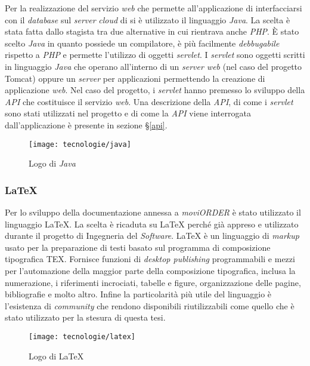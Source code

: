 Per la realizzazione del servizio \textit{web} che permette all'applicazione di interfacciarsi con il \textit{database} sul \textit{server} \textit{cloud} di \visione{} si è utilizzato il linguaggio \textit{Java}. La scelta è stata fatta dallo stagista tra due alternative in cui rientrava anche \textit{PHP}. È stato scelto \textit{Java} in quanto possiede un compilatore, è più facilmente \textit{debbugabile} rispetto a \textit{PHP} e permette l'utilizzo di oggetti \textit{servlet}.  I \textit{servlet} sono oggetti scritti in linguaggio \textit{Java} che operano all'interno di un \textit{server web} (nel caso del progetto Tomcat) oppure un \textit{server} per applicazioni permettendo la creazione di applicazione \textit{web}. Nel caso del progetto, i \textit{servlet} hanno premesso lo sviluppo della \textit{API} che costituisce il servizio \textit{web}. Una descrizione della \textit{API}, di come i \textit{servlet} sono stati utilizzati nel progetto e di come la \textit{API} viene interrogata dall'applicazione è presente in sezione §\ref{api}.

\begin{figure}[!h] 
    \centering 
    \texttt{[image: tecnologie/java]} 
    \caption{Logo di \textit{Java}}
\end{figure}

\subsubsection{\LaTeX{}}

Per lo sviluppo della documentazione annessa a \textit{moviORDER} è stato utilizzato il linguaggio \LaTeX{}. La scelta è ricaduta su \LaTeX{} perché già appreso e utilizzato durante il progetto di Ingegneria del \textit{Software}. \LaTeX{} è un linguaggio di \textit{markup} usato per la preparazione di testi basato sul programma di composizione tipografica TEX. Fornisce funzioni di \textit{desktop publishing} programmabili e mezzi per l'automazione della maggior parte della composizione tipografica, inclusa la numerazione, i riferimenti incrociati, tabelle e figure, organizzazione delle pagine, bibliografie e molto altro. Infine la particolarità più utile del linguaggio è l'esistenza di \textit{community} che rendono disponibili  riutilizzabili come quello che è stato utilizzato per la stesura di questa tesi.

\begin{figure}[!h] 
    \centering 
    \texttt{[image: tecnologie/latex]} 
    \caption{Logo di \LaTeX{}}
\end{figure}


